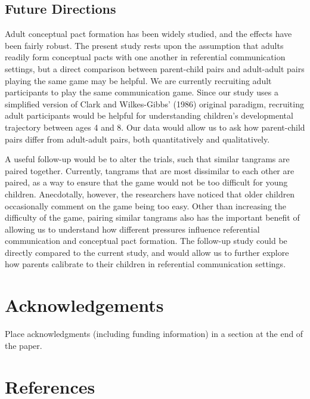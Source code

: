 \documentclass[10pt, letterpaper]{article}
\begin{document}
\hypertarget{future-directions}{%
\subsection{Future Directions}\label{future-directions}}

Adult conceptual pact formation has been widely studied, and the effects
have been fairly robust. The present study rests upon the assumption
that adults readily form conceptual pacts with one another in
referential communication settings, but a direct comparison between
parent-child pairs and adult-adult pairs playing the same game may be
helpful. We are currently recruiting adult participants to play the same
communication game. Since our study uses a simplified version of Clark
and Wilkes-Gibbs' (1986) original paradigm, recruiting adult
participants would be helpful for understanding children's developmental
trajectory between ages 4 and 8. Our data would allow us to ask how
parent-child pairs differ from adult-adult pairs, both quantitatively
and qualitatively.

A useful follow-up would be to alter the trials, such that similar
tangrams are paired together. Currently, tangrams that are most
dissimilar to each other are paired, as a way to ensure that the game
would not be too difficult for young children. Anecdotally, however, the
researchers have noticed that older children occasionally comment on the
game being too easy. Other than increasing the difficulty of the game,
pairing similar tangrams also has the important benefit of allowing us
to understand how different pressures influence referential
communication and conceptual pact formation. The follow-up study could
be directly compared to the current study, and would allow us to further
explore how parents calibrate to their children in referential
communication settings.

\hypertarget{acknowledgements}{%
\section{Acknowledgements}\label{acknowledgements}}

Place acknowledgments (including funding information) in a section at
the end of the paper.

\hypertarget{references}{%
\section{References}\label{references}}
\end{document}
